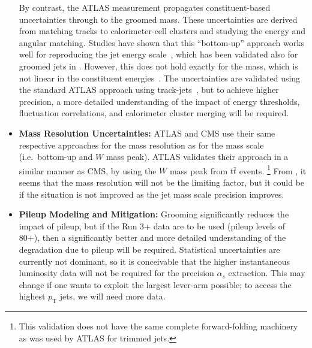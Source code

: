 \documentclass[11pt]{cernrep}
\begin{document}
\begin{itemize}
By contrast, the ATLAS measurement propagates constituent-based uncertainties through to the groomed mass.
%
These uncertainties are derived from matching tracks to calorimeter-cell clusters and studying the energy and angular matching.
%
Studies have shown that this ``bottom-up'' approach works well for reproducing the jet energy scale~\cite{Aaboud:2016hwh}, which has been validated also for groomed jets in \cite{Aaboud:2017qwh}.
%
However, this does not hold exactly for the mass, which is not linear in the constituent energies~\cite{Nachman:2016qyc}.
%
The uncertainties are validated using the standard ATLAS approach using track-jets~\cite{Aad:2013gja,ATLAS-CONF-2017-063}, but to achieve higher precision, a more detailed understanding of the impact of energy thresholds, fluctuation correlations, and calorimeter cluster merging will be required.
%
\item {\bf Mass Resolution Uncertainties:} ATLAS and CMS use their same respective approaches for the mass resolution as for the mass scale (i.e.\ bottom-up and $W$ mass peak).
%
ATLAS validates their approach in a similar manner as CMS, by using the $W$ mass peak from $t\bar{t}$ events.%
\footnote{This validation does not have the same complete forward-folding machinery as was used by ATLAS for trimmed jets.}
%
From \cite{jetsub_alphas_fig:expfit}, it seems that the mass resolution will not be the limiting factor, but it could be if the situation is not improved as the jet mass scale precision improves.
%
\item {\bf Pileup Modeling and Mitigation:} Grooming significantly reduces the impact of pileup, but if the Run 3+ data are to be used (pileup levels of 80+), then a significantly better and more detailed understanding of the degradation due to pileup will be required.
%
Statistical uncertainties are currently not dominant, so it is conceivable that the higher instantaneous luminosity data will not be required for the precision $\alpha_s$ extraction.
%
This may change if one wants to exploit the largest lever-arm possible; to access the highest $p_{\mathrm{T}}$ jets, we will need more data.
%
\end{itemize}
\end{document}
